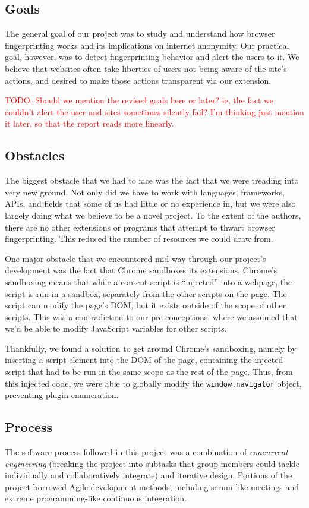 \documentclass[12pt,a4paper]{article}
\begin{document}
\subsection{Goals}
The general goal of our project was to study and understand how browser fingerprinting works and its implications on internet anonymity. Our practical goal, however, was to detect fingerprinting behavior and alert the users to it. We believe that websites often take liberties of users not being aware of the site's actions, and desired to make those actions transparent via our extension.

\textcolor{red}{TODO: Should we mention the revised goals here or later? ie, the fact we couldn't alert the user and sites sometimes silently fail? I'm thinking just mention it later, so that the report reads more linearly.}

\subsection{Obstacles}
The biggest obstacle that we had to face was the fact that we were treading into very new ground. Not only did we have to work with languages, frameworks, APIs, and fields that some of us had little or no experience in, but we were also largely doing what we believe to be a novel project. To the extent of the authors, there are no other extensions or programs that attempt to thwart browser fingerprinting. This reduced the number of resources we could draw from.

One major obstacle that we encountered mid-way through our project's development was the fact that Chrome sandboxes its extensions. Chrome's sandboxing means that while a content script is ``injected'' into a webpage, the script is run in a sandbox, separately from the other scripts on the page. The script can modify the page's DOM, but it exists outside of the scope of other scripts. This was a contradiction to our pre-conceptions, where we assumed that we'd be able to modify JavaScript variables for other scripts.

Thankfully, we found a solution to get around Chrome's sandboxing, namely by inserting a script element into the DOM of the page, containing the injected script that had to be run in the same scope as the rest of the page. Thus, from this injected code, we were able to globally modify the \texttt{window.navigator} object, preventing plugin enumeration.

\subsection{Process}
The software process followed in this project was a combination of \textit{concurrent engineering} (breaking the project into subtasks that group members could tackle individually and collaboratively integrate) and iterative design. Portions of the project borrowed Agile development methods, including scrum-like meetings and extreme programming-like continuous integration.
\end{document}
